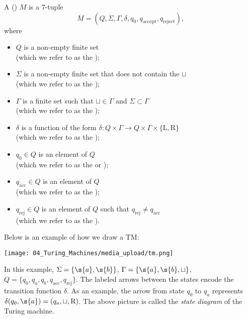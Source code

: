 \begin{flex}
\begin{definition} \label{definition:Turing-machine} 
A  () $M$ is a 7-tuple 
\[
M = (Q, \Sigma, \Gamma, \delta, q_0, q_\text{accept}, q_\text{reject}),
\]
where
\begin{itemize}
    \item $Q$ is a non-empty finite set \\(which we refer to as the );
    \item $\Sigma$ is a non-empty finite set that does not contain the  $\sqcup$ \\(which we refer to as the );
    \item $\Gamma$ is a finite set such that $\sqcup \in \Gamma$ and $\Sigma \subset \Gamma$ \\(which we refer to as the );
    \item $\delta$ is a function of the form $\delta: Q \times \Gamma \to Q \times \Gamma \times \{\text{L}, \text{R}\}$ \\(which we refer to as the );
    \item $q_0 \in Q$ is an element of $Q$ \\ (which we refer to as the  or );
    \item $q_\text{acc} \in Q$ is an element of $Q$ \\ (which we refer to as the );
    \item $q_\text{rej} \in Q$ is an element of $Q$ such that $q_\text{rej} \neq q_\text{acc}$ \\ (which we refer to as the ).
\end{itemize}
\end{definition}

\begin{example}[A $5$-state TM] \label{example:A-5-state-TM}
Below is an example of how we draw a TM:
\begin{center}
    \texttt{[image: 04\_Turing\_Machines/media\_upload/tm.png]}
\end{center}
In this example, $\Sigma = \{\s{a},\s{b}\}$, $\Gamma = \{\s{a},\s{b},\sqcup\}$, $Q = \{q_0,q_a,q_b,q_\text{acc},q_\text{rej}\}$. The labeled arrows between the states encode the transition function $\delta$. As an example, the arrow from state $q_0$ to $q_a$ represents $\delta(q_0, \s{a}) = (q_a, \sqcup, \text{R})$. The above picture is called the \emph{state diagram} of the Turing machine.
\end{example}
\end{flex}


